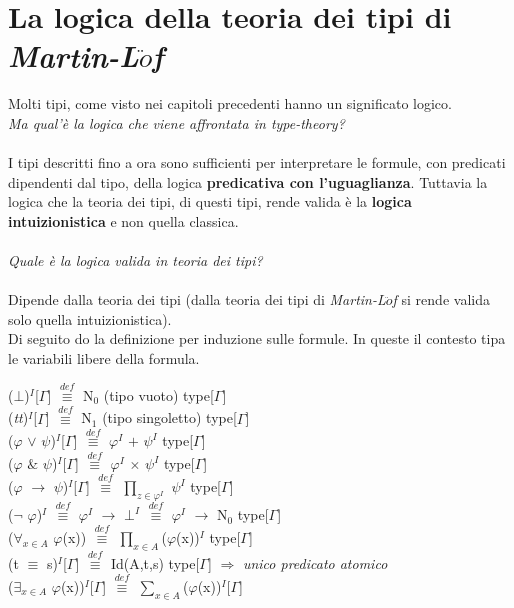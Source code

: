 \chapter{La logica della teoria dei tipi di \textit{Martin-L$\ddot{o}$f}}
\label{cap:la-logica-della-teoria-dei-tipi-di-Martin-Lof}
Molti tipi, come visto nei capitoli precedenti hanno un significato logico.\\\textit{Ma qual'\`e la logica che viene affrontata in \textit{type-theory}?}\\\\
\noindent I tipi descritti fino a ora sono sufficienti per interpretare le formule, con predicati dipendenti dal tipo, della logica \textbf{predicativa con l'uguaglianza}. Tuttavia la logica che la teoria dei tipi, di questi tipi, rende valida \`e la \textbf{logica intuizionistica} e non quella classica.\\\\
\noindent
\textit{Quale \`e la logica valida in teoria dei tipi?}\\\\
\noindent Dipende dalla teoria dei tipi (dalla teoria dei tipi di \textit{Martin-L$\ddot{o}$f} si rende valida solo quella intuizionistica).\\
Di seguito do la definizione per induzione sulle formule. In queste il contesto tipa le variabili libere della formula.
\begin{center}
($\bot$)$^I$[$\Gamma$] ${\overset{\mathit{def}}{\equiv}}$ N$_0$ (tipo vuoto) type[$\Gamma$]\\
(\textit{tt})$^I$[$\Gamma$] ${\overset{\mathit{def}}{\equiv}}$ N$_1$ (tipo singoletto) type[$\Gamma$]\\
($\varphi$ $\vee$ $\psi$)$^I$[$\Gamma$] ${\overset{\mathit{def}}{\equiv}}$ $\varphi^I$ $+$ $\psi^I$ type[$\Gamma$]\\
($\varphi$ $\&$ $\psi$)$^I$[$\Gamma$] ${\overset{\mathit{def}}{\equiv}}$ $\varphi^I$ $\times$ $\psi^I$ type[$\Gamma$]\\
($\varphi$ $\rightarrow$ $\psi$)$^I$[$\Gamma$] ${\overset{\mathit{def}}{\equiv}}$ $\prod_{z \in \varphi^I}$ $\psi^I$ type[$\Gamma$]\\
($\neg$ $\varphi$)$^I$ ${\overset{\mathit{def}}{\equiv}}$ $\varphi^I$ $\rightarrow$ $\bot^I$ ${\overset{\mathit{def}}{\equiv}}$ $\varphi^I$ $\rightarrow$ N$_0$ type[$\Gamma$]\\
($\forall_{x \in A}$ $\varphi$(x)) ${\overset{\mathit{def}}{\equiv}}$ $\prod\limits_{x \in A}$($\varphi$(x))$^I$ type[$\Gamma$]\\
(t $\equiv$ s)$^I$[$\Gamma$] ${\overset{\mathit{def}}{\equiv}}$ Id(A,t,s) type[$\Gamma$] $\Rightarrow$ \textit{unico predicato atomico}\\
($\exists_{x \in A}$ $\varphi$(x))$^I$[$\Gamma$] ${\overset{\mathit{def}}{\equiv}}$ $\sum\limits_{x \in A}$($\varphi$(x))$^I$[$\Gamma$]
\end{center}
